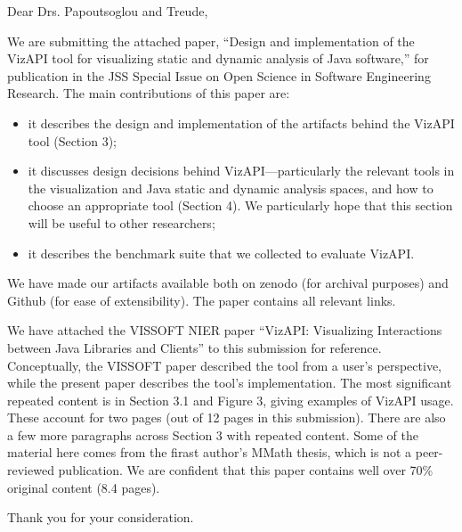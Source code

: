 \documentclass{letter}
\begin{document}
\begin{letter}{}
\opening{Dear Drs. Papoutsoglou and Treude,}

We are submitting the attached paper, ``Design and implementation of the VizAPI tool for visualizing static and dynamic analysis of Java software,'' for publication in the JSS Special Issue on Open Science in Software Engineering Research. The main contributions of this paper are:
\begin{itemize}
\item it describes the design and implementation of the artifacts behind the VizAPI tool (Section 3);
\item it discusses design decisions behind VizAPI---particularly the relevant tools in the visualization and Java static and dynamic analysis spaces, and how to choose an appropriate tool (Section 4).
We particularly hope that this section will be useful to other researchers;
\item it describes the benchmark suite that we collected to evaluate VizAPI.
\end{itemize}

We have made our artifacts available both on zenodo (for archival
purposes) and Github (for ease of extensibility). The paper contains
all relevant links.

We have attached the VISSOFT NIER paper ``VizAPI: Visualizing
Interactions between Java Libraries and Clients'' to this submission
for reference. Conceptually, the VISSOFT paper described the tool from
a user's perspective, while the present paper describes the tool's
implementation. The most significant repeated content is in Section
3.1 and Figure 3, giving examples of VizAPI usage. These account for
two pages (out of 12 pages in this submission). There are also a few
more paragraphs across Section 3 with repeated content. Some of the
material here comes from the firast author's MMath thesis, which is
not a peer-reviewed publication. We are confident that this paper
contains well over 70\% original content (8.4 pages).

\closing{Thank you for your consideration.}

%
%

\end{letter} 
\end{document}
